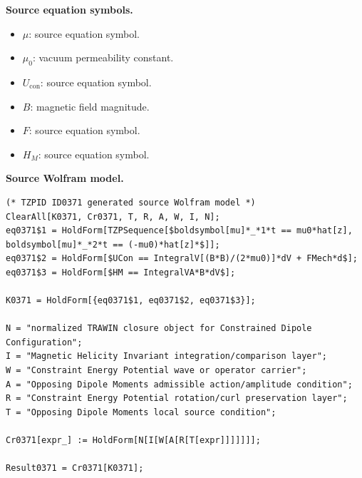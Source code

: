\begin{minipage}[t]{0.49\linewidth}
\begingroup
\small
\raggedright
\textbf{Source equation symbols.}\par
\begin{itemize}[leftmargin=1.35em,itemsep=1pt,topsep=1pt,parsep=0pt]
    \item $\mu$: source equation symbol.
    \item $\mu_0$: vacuum permeability constant.
    \item $U_{\mathrm{con}}$: source equation symbol.
    \item $B$: magnetic field magnitude.
    \item $F$: source equation symbol.
    \item $H_M$: source equation symbol.
\end{itemize}
\endgroup
\end{minipage}\hfill
\begin{minipage}[t]{0.47\linewidth}
\begingroup
\scriptsize
\raggedright
\textbf{Source Wolfram model.}\par
\begin{Verbatim}[fontsize=\tiny,breaklines=true,breakanywhere=true]
(* TZPID ID0371 generated source Wolfram model *)
ClearAll[K0371, Cr0371, T, R, A, W, I, N];
eq0371$1 = HoldForm[TZPSequence[$boldsymbol[mu]*_*1*t == mu0*hat[z], boldsymbol[mu]*_*2*t == (-mu0)*hat[z]*$]];
eq0371$2 = HoldForm[$UCon == IntegralV[(B*B)/(2*mu0)]*dV + FMech*d$];
eq0371$3 = HoldForm[$HM == IntegralVA*B*dV$];

K0371 = HoldForm[{eq0371$1, eq0371$2, eq0371$3}];

N = "normalized TRAWIN closure object for Constrained Dipole Configuration";
I = "Magnetic Helicity Invariant integration/comparison layer";
W = "Constraint Energy Potential wave or operator carrier";
A = "Opposing Dipole Moments admissible action/amplitude condition";
R = "Constraint Energy Potential rotation/curl preservation layer";
T = "Opposing Dipole Moments local source condition";

Cr0371[expr_] := HoldForm[N[I[W[A[R[T[expr]]]]]]];

Result0371 = Cr0371[K0371];
\end{Verbatim}
\endgroup
\end{minipage}

